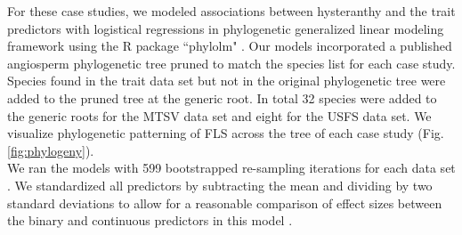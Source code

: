 \documentclass{article}\usepackage[]{graphicx}\usepackage[]{color}
\begin{document}
\noindent For these case studies, we modeled associations between hysteranthy and the trait predictors with logistical regressions in phylogenetic generalized linear modeling framework \citep{Ives2010} using the R package ``phylolm" \citep{Ho2014}. Our models incorporated a published angiosperm phylogenetic tree \citep{Zanne2013} pruned to match the species list for each case study. Species found in the trait data set but not in the original phylogenetic tree were added to the pruned tree at the generic root. In total 32 species were added to the generic roots for the MTSV data set and eight for the USFS data set. We visualize phylogenetic patterning of FLS across the tree of each case study (Fig. \ref{fig:phylogeny}).\\

\noindent We ran the models with 599 bootstrapped re-sampling iterations for each data set \citep{Wilcox2010}. We standardized all predictors by subtracting the mean and dividing by two standard deviations to allow for a reasonable comparison of effect sizes between the binary and continuous predictors in this model \citep{Gelman2007}. 
\end{document}
